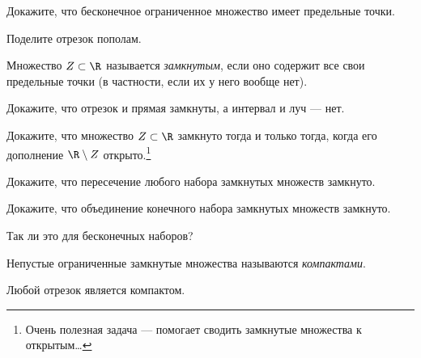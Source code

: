\documentclass[a4paper, 12pt, num=2729, date=01.09.2020]{listok}
\begin{document}
\begin{problem}[$\mathghost$]
    Докажите, что бесконечное ограниченное множество имеет предельные точки.
\end{problem}
\begin{note}
    Поделите отрезок пополам.
\end{note}

\begin{definition}
    Множество $Z \subset \R$ называется \textit{замкнутым}, если оно содержит все свои предельные точки (в частности, если их у него вообще нет).
\end{definition}

\begin{problem}
    Докажите, что отрезок и прямая замкнуты, а интервал и луч --- нет.
\end{problem}

\begin{problem}
    Докажите, что множество $Z \subset \R$ замкнуто тогда и только тогда, когда его дополнение $\R \setminus Z$ открыто.\footnote{Очень полезная задача --- помогает сводить замкнутые множества к открытым\ldots}
\end{problem}

\begin{problem}
    Докажите, что пересечение любого набора замкнутых множеств замкнуто.
\end{problem}

\begin{problem}
\begin{probparts}
    \item Докажите, что объединение конечного набора замкнутых множеств замкнуто.
    \item Так ли это для бесконечных наборов?
\end{probparts}
\end{problem}


\begin{definition}
    Непустые ограниченные замкнутые множества называются \textit{компактами}.
\end{definition}

\begin{example*}
    Любой отрезок является компактом. 
\end{example*}
\end{document}
